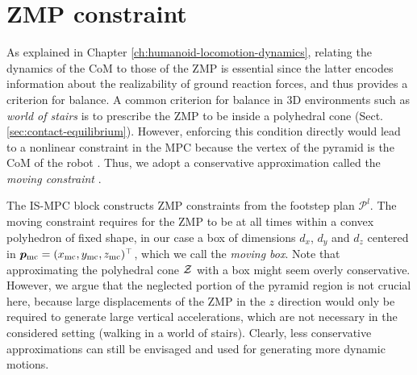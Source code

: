 \section{ZMP constraint}
As explained in Chapter \ref{ch:humanoid-locomotion-dynamics},
relating the dynamics of the CoM to those of the ZMP is essential since the
latter encodes information about the realizability of ground reaction forces,
and thus provides a criterion for balance. A common criterion for balance
in 3D environments such as \textit{world of stairs}
is to prescribe the ZMP to be inside a polyhedral cone
(Sect. \ref{sec:contact-equilibrium}). However, enforcing this condition
directly would lead to a nonlinear constraint
in the MPC because the vertex of the pyramid is the CoM of the robot
\cite{Caron2017DynamicWalkingOverRoughTerrains}.
Thus, we adopt a conservative approximation called the \textit{moving constraint}
\cite{Aboudonia2017Humanoids}.

The IS-MPC block constructs ZMP constraints from the footstep plan
$\mathcal{P}^l$. The moving constraint requires for the ZMP to be at all
times within a convex
polyhedron of fixed shape, in our case a box of dimensions $d_x$, $d_y$ and
$d_z$ centered in ${\bm{p}}_{\rm mc}=(x_{\rm mc}, y_{\rm mc}, z_{\rm mc})^\top$,
which we call the \textit{moving box}. Note that approximating the polyhedral cone
$\cal Z$ with a box might seem overly conservative. However, we argue that the
neglected portion of the pyramid region is not crucial here, because large
displacements of the ZMP in the $z$ direction would only be required to generate
large vertical accelerations, which are not necessary in the considered setting
(walking in a world of stairs). Clearly, less conservative approximations can
still be envisaged and used for generating more dynamic motions.

